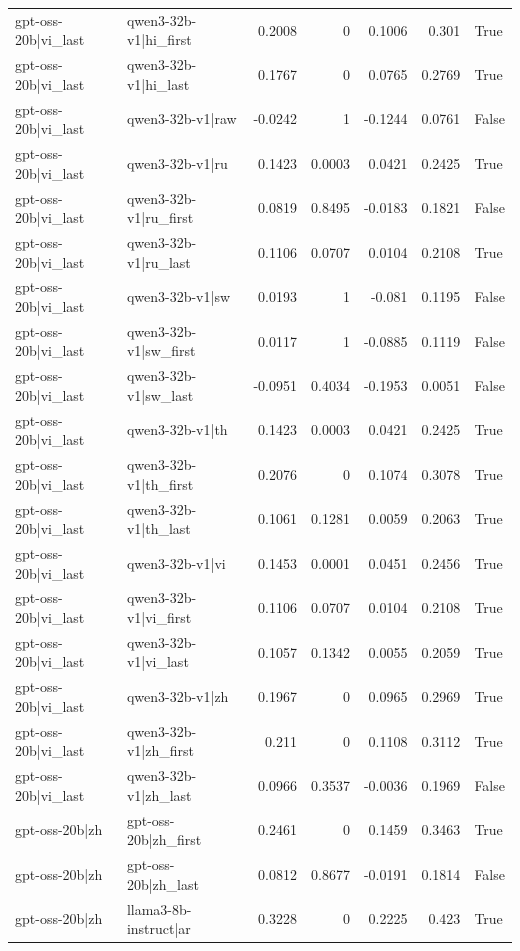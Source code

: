 \begin{table}
\begin{tabular}{l l r r r r l}
gpt-oss-20b|vi_last & qwen3-32b-v1|hi_first & 0.2008 & 0 & 0.1006 & 0.301 & True \\
gpt-oss-20b|vi_last & qwen3-32b-v1|hi_last & 0.1767 & 0 & 0.0765 & 0.2769 & True \\
gpt-oss-20b|vi_last & qwen3-32b-v1|raw & -0.0242 & 1 & -0.1244 & 0.0761 & False \\
gpt-oss-20b|vi_last & qwen3-32b-v1|ru & 0.1423 & 0.0003 & 0.0421 & 0.2425 & True \\
gpt-oss-20b|vi_last & qwen3-32b-v1|ru_first & 0.0819 & 0.8495 & -0.0183 & 0.1821 & False \\
gpt-oss-20b|vi_last & qwen3-32b-v1|ru_last & 0.1106 & 0.0707 & 0.0104 & 0.2108 & True \\
gpt-oss-20b|vi_last & qwen3-32b-v1|sw & 0.0193 & 1 & -0.081 & 0.1195 & False \\
gpt-oss-20b|vi_last & qwen3-32b-v1|sw_first & 0.0117 & 1 & -0.0885 & 0.1119 & False \\
gpt-oss-20b|vi_last & qwen3-32b-v1|sw_last & -0.0951 & 0.4034 & -0.1953 & 0.0051 & False \\
gpt-oss-20b|vi_last & qwen3-32b-v1|th & 0.1423 & 0.0003 & 0.0421 & 0.2425 & True \\
gpt-oss-20b|vi_last & qwen3-32b-v1|th_first & 0.2076 & 0 & 0.1074 & 0.3078 & True \\
gpt-oss-20b|vi_last & qwen3-32b-v1|th_last & 0.1061 & 0.1281 & 0.0059 & 0.2063 & True \\
gpt-oss-20b|vi_last & qwen3-32b-v1|vi & 0.1453 & 0.0001 & 0.0451 & 0.2456 & True \\
gpt-oss-20b|vi_last & qwen3-32b-v1|vi_first & 0.1106 & 0.0707 & 0.0104 & 0.2108 & True \\
gpt-oss-20b|vi_last & qwen3-32b-v1|vi_last & 0.1057 & 0.1342 & 0.0055 & 0.2059 & True \\
gpt-oss-20b|vi_last & qwen3-32b-v1|zh & 0.1967 & 0 & 0.0965 & 0.2969 & True \\
gpt-oss-20b|vi_last & qwen3-32b-v1|zh_first & 0.211 & 0 & 0.1108 & 0.3112 & True \\
gpt-oss-20b|vi_last & qwen3-32b-v1|zh_last & 0.0966 & 0.3537 & -0.0036 & 0.1969 & False \\
gpt-oss-20b|zh & gpt-oss-20b|zh_first & 0.2461 & 0 & 0.1459 & 0.3463 & True \\
gpt-oss-20b|zh & gpt-oss-20b|zh_last & 0.0812 & 0.8677 & -0.0191 & 0.1814 & False \\
gpt-oss-20b|zh & llama3-8b-instruct|ar & 0.3228 & 0 & 0.2225 & 0.423 & True \\

\end{tabular}
\end{table}
